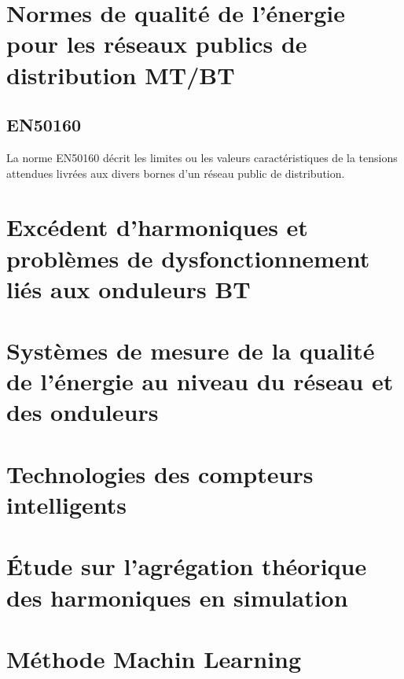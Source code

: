 \section{Normes de qualité de l'énergie pour les réseaux publics de distribution MT/BT}

\subsection{EN50160}

La norme EN50160 \cite{en50160} décrit les limites ou les valeurs caractéristiques de la tensions attendues livrées aux divers bornes d'un réseau public de distribution.


\section{Excédent d'harmoniques et problèmes de dysfonctionnement liés aux onduleurs BT}



\section{Systèmes de mesure de la qualité de l'énergie au niveau du réseau et des onduleurs}



\section{Technologies des compteurs intelligents}



\section{Étude sur l'agrégation théorique des harmoniques en simulation}



\section{Méthode Machin Learning}